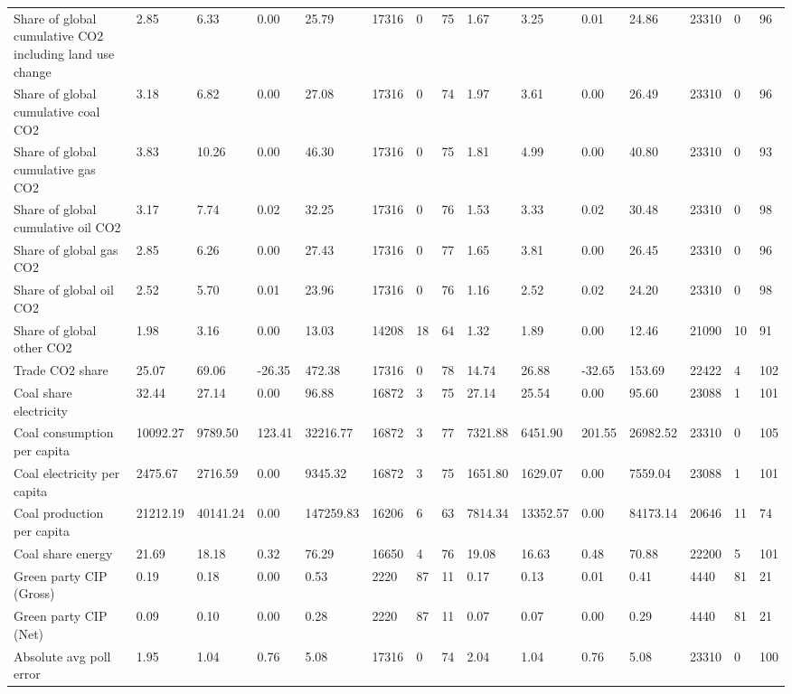 \begin{longtable}{lllllllllllllll}
Share of global cumulative CO2 including land use change & 2.85 & 6.33 & 0.00 & 25.79 & 17316 & 0 & 75 & 1.67 & 3.25 & 0.01 & 24.86 & 23310 & 0 & 96\\
Share of global cumulative coal CO2 & 3.18 & 6.82 & 0.00 & 27.08 & 17316 & 0 & 74 & 1.97 & 3.61 & 0.00 & 26.49 & 23310 & 0 & 96\\
Share of global cumulative gas CO2 & 3.83 & 10.26 & 0.00 & 46.30 & 17316 & 0 & 75 & 1.81 & 4.99 & 0.00 & 40.80 & 23310 & 0 & 93\\
Share of global cumulative oil CO2 & 3.17 & 7.74 & 0.02 & 32.25 & 17316 & 0 & 76 & 1.53 & 3.33 & 0.02 & 30.48 & 23310 & 0 & 98\\
\addlinespace
Share of global gas CO2 & 2.85 & 6.26 & 0.00 & 27.43 & 17316 & 0 & 77 & 1.65 & 3.81 & 0.00 & 26.45 & 23310 & 0 & 96\\
Share of global oil CO2 & 2.52 & 5.70 & 0.01 & 23.96 & 17316 & 0 & 76 & 1.16 & 2.52 & 0.02 & 24.20 & 23310 & 0 & 98\\
Share of global other CO2 & 1.98 & 3.16 & 0.00 & 13.03 & 14208 & 18 & 64 & 1.32 & 1.89 & 0.00 & 12.46 & 21090 & 10 & 91\\
Trade CO2 share & 25.07 & 69.06 & -26.35 & 472.38 & 17316 & 0 & 78 & 14.74 & 26.88 & -32.65 & 153.69 & 22422 & 4 & 102\\
Coal share electricity & 32.44 & 27.14 & 0.00 & 96.88 & 16872 & 3 & 75 & 27.14 & 25.54 & 0.00 & 95.60 & 23088 & 1 & 101\\
\addlinespace
Coal consumption per capita & 10092.27 & 9789.50 & 123.41 & 32216.77 & 16872 & 3 & 77 & 7321.88 & 6451.90 & 201.55 & 26982.52 & 23310 & 0 & 105\\
Coal electricity per capita & 2475.67 & 2716.59 & 0.00 & 9345.32 & 16872 & 3 & 75 & 1651.80 & 1629.07 & 0.00 & 7559.04 & 23088 & 1 & 101\\
Coal production per capita & 21212.19 & 40141.24 & 0.00 & 147259.83 & 16206 & 6 & 63 & 7814.34 & 13352.57 & 0.00 & 84173.14 & 20646 & 11 & 74\\
Coal share energy & 21.69 & 18.18 & 0.32 & 76.29 & 16650 & 4 & 76 & 19.08 & 16.63 & 0.48 & 70.88 & 22200 & 5 & 101\\
Green party CIP (Gross) & 0.19 & 0.18 & 0.00 & 0.53 & 2220 & 87 & 11 & 0.17 & 0.13 & 0.01 & 0.41 & 4440 & 81 & 21\\
\addlinespace
Green party CIP (Net) & 0.09 & 0.10 & 0.00 & 0.28 & 2220 & 87 & 11 & 0.07 & 0.07 & 0.00 & 0.29 & 4440 & 81 & 21\\
Absolute avg poll error & 1.95 & 1.04 & 0.76 & 5.08 & 17316 & 0 & 74 & 2.04 & 1.04 & 0.76 & 5.08 & 23310 & 0 & 100\\

\end{longtable}
